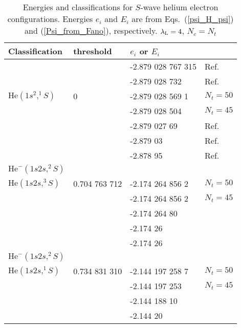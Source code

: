 \documentclass[aip
, pra
, showpacs
, aps
, twocolumn
, groupedaddress
, floatfix
]{revtex4}
\begin{document}
\begin{table}[htb]
\caption{\label{Tab_ENGS}
Energies and classifications for $S$-wave helium electron configurations.
Energies $e_i$  and $E_i$ are from Eqs.~(\ref{psi_H_psi}) and (\ref{Psi_from_Fano}), respectively.
$\lambda_{\rm L}=4$, $N_c=N_t$
}

\begin{ruledtabular}
\begin{tabular}{llll}
Classification & threshold & $e_i$  or $E_i$ &    \\
\hline
                      &    & -2.879 028 767 315 &  Ref. \cite{G94}    \\
                      &    & -2.879 028 732   &  Ref. \cite{JB97p2614}    \\
$\mbox{He}(1s^2,^1S)$ &  0 & -2.879 028 569 1 &  $N_t=50$   \\ %
                      &    & -2.879 028 504   &  $N_t=45$   \\
                      &    & -2.879 027 69    &  Ref. \cite{DHIF94}    \\
                      &    & -2.879 03        &  Ref. \cite{HMR05R}    \\
                      &    & -2.878 95        &  Ref. \cite{BS10p022715}    \\
\hline
$\mbox{He}^-(1s2s,^2S)$  &&		  &  \\
\hline
$\mbox{He}(1s2s,^3S)$    & 0.704 763 712  & -2.174 264 856 2 & $N_t=50$ \\  %
                         &                & -2.174 264 856 2 & $N_t=45$ \\
                         &                & -2.174 264 80  & \\
                         &                & -2.174 26      & \\
                         &                & -2.174 26      & \\
\hline
$\mbox{He}^-(1s2s,^2S)$  &&      & \\
\hline
$\mbox{He}(1s2s,^1S)$    & 0.734 831 310 & -2.144 197 258 7 &  $N_t=50$ \\
                         &               & -2.144 197 253   &  $N_t=45$   \\
                         &               & -2.144 188 10    &    \\
                         &               & -2.144 20        &    \\

\end{tabular}
\end{ruledtabular}
\end{table}
\end{document}
